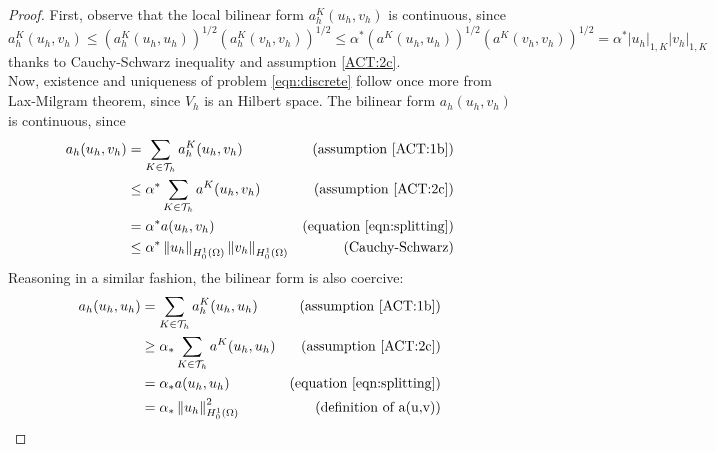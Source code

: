 \documentclass[10pt]{article}
\newcommand{\norm}[2]{\left\lVert#1\right\rVert_{#2}}
\begin{document}
\begin{proof}
	First, observe that the local bilinear form $a_h^K(u_h,v_h)$ is continuous, since
	\begin{equation}
	a_h^K(u_h,v_h) \leq (a_h^K(u_h,u_h))^{1/2}(a_h^K(v_h,v_h))^{1/2} \leq \alpha^*(a^K(u_h,u_h))^{1/2}(a^K(v_h,v_h))^{1/2} = \alpha^* |u_h|_{1,K} |v_h|_{1,K} 
	\label{eqn:continuity_ah}
	\end{equation}
	thanks to Cauchy-Schwarz inequality and assumption \eqref{ACT:2c}. \\
	Now, existence and uniqueness of problem \eqref{eqn:discrete} follow once more from Lax-Milgram theorem, since $V_h$ is an Hilbert space. The bilinear form $a_h(u_h,v_h)$ is continuous, since
	\begin{align*}
	a_h(u_h,v_h) &= \sum_{K \in \mathcal{T}_h} a_h^K(u_h,v_h)  & \text{(assumption \eqref{ACT:1b})}\\
	&\leq \alpha^* \sum_{K \in \mathcal{T}_h} a^K(u_h,v_h) & \text{(assumption \eqref{ACT:2c})}\\
	&=\alpha^* a(u_h,v_h)   & \text{(equation \eqref{eqn:splitting})} \\
	&\leq \alpha^* \norm{u_h}{H_0^1(\Omega)} \norm{v_h}{H_0^1(\Omega)} & \text{(Cauchy-Schwarz)}
	\end{align*} 
	Reasoning in a similar fashion, the bilinear form is also coercive:
	\begin{align*}
	a_h(u_h,u_h) &= \sum_{K \in \mathcal{T}_h} a_h^K(u_h,u_h)  & \text{(assumption \eqref{ACT:1b})}\\
	&\geq \alpha_* \sum_{K \in \mathcal{T}_h} a^K(u_h,u_h) & \text{(assumption \eqref{ACT:2c})}\\
	&=\alpha_* a(u_h,u_h)   & \text{(equation \eqref{eqn:splitting})} \\
	&= \alpha_* \norm{u_h}{H_0^1(\Omega)}^2 & \text{(definition of a(u,v))}
	\end{align*}


\end{proof}
\end{document}

